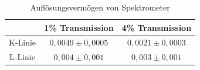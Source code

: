 \begin{table}[h]
    \centering
    \caption{Auflösungsvermögen von Spektrometer}
    \label{tab:aufloesung}
    \begin{tabular}{c | c c}
      \toprule
       & 1\% Transmission & 4\% Transmission \\
      \midrule
      K-Linie & $0,0049 \pm 0,0005$ & $0,0021 \pm 0,0003$\\
      L-Linie & $0,004 \pm 0,001$ & $0,003 \pm 0,001$\\
      \bottomrule
    \end{tabular}
  \end{table}

